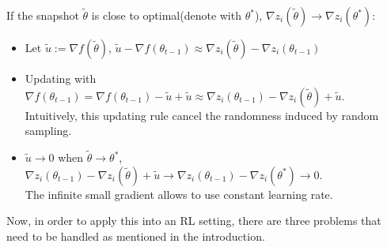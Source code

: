 If the snapshot $\tilde{\theta}$ is close to optimal(denote with $\theta^*$),  $\nabla z_i(\tilde{\theta}) \rightarrow \nabla z_i(\theta^*)$:
\begin{itemize}
    \item Let $\tilde{u}:=\nabla f(\tilde{\theta})$, \;$\tilde{u}-\nabla f(\theta_{t-1}) \approx \nabla z_i(\tilde{\theta}) - \nabla z_i(\theta_{t-1})$
    
    \item Updating with $\nabla f(\theta_{t-1}) = \nabla f(\theta_{t-1})-\tilde{u}+\tilde{u} \approx \nabla z_i(\theta_{t-1}) - \nabla z_i(\tilde{\theta})+\tilde{u}$.\\
    Intuitively, this updating rule cancel the randomness induced by random sampling.
    
    \item $\tilde{u} \rightarrow 0$ when $\tilde{\theta} \rightarrow \theta^*$, \;$\nabla z_i(\theta_{t-1}) - \nabla z_i(\tilde{\theta}) + \tilde{u} \rightarrow \nabla z_i(\theta_{t-1}) - \nabla z_i(\theta^*) \rightarrow 0$.\\
    The infinite small gradient allows to use constant learning rate.
\end{itemize}

Now, in order to apply this into an RL setting, there are three problems that need to be handled as mentioned in the introduction.

